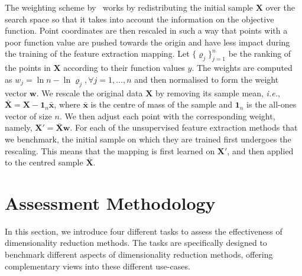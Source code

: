 The weighting scheme by~\citet{RapEtAl20} works by redistributing the initial sample $\mathbf X$ over the search space so that it takes into account the information on the objective function.
Point coordinates are then rescaled in such a way that points with a poor function value are pushed towards the origin and have less impact during the training of the feature extraction mapping.
Let $\{\varrho_j\}_{j=1}^n$ be the ranking of the points in $\mathbf X$ according to their function values $y$. The weights are computed as $w_j = \ln{n} - \ln{\varrho_j}, \forall j=1,\dots,n$ and then normalised to form the weight vector $\mathbf w$.
We rescale the original data $\mathbf X$ by removing its sample mean, \emph{i.e.}, $\bar{\mathbf X} = \mathbf X - \mathbf{1}_n\bar{\mathbf x}$, where
$\bar{\mathbf x}$ is the centre of mass of the sample and $\mathbf{1}_n$ is the all-ones vector of size $n$.
We then adjust each point with the corresponding weight, namely, $\mathbf X' = \bar{\mathbf X}\mathbf w$.
For each of the unsupervised feature extraction methods that we benchmark, the initial sample on which they are trained first undergoes the rescaling. This means that the mapping is first learned on $\mathbf X'$, and then applied to the centred sample $\bar{\mathbf X}$.

\section{Assessment Methodology}
\label{sec:ch05:tasks}
In this section, we introduce four different tasks to assess the effectiveness of dimensionality reduction methods.
The tasks are specifically designed to benchmark different aspects of dimensionality reduction methods, offering complementary views into these different use-cases.

\FloatBarrier
